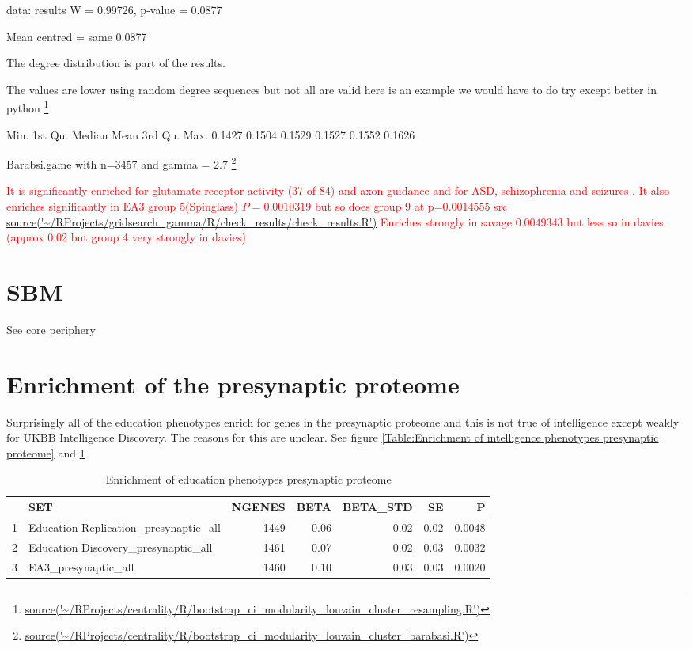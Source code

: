 data:  results
W = 0.99726, p-value = 0.0877

Mean centred = same 0.0877

The degree distribution is part of the results. 

The values are lower using random degree sequences but not all are valid here is an example we would have to do try except better in python \footnote{\url{source('~/RProjects/centrality/R/bootstrap_ci_modularity_louvain_cluster_resampling.R')}}

   Min. 1st Qu.  Median    Mean 3rd Qu.    Max. 
 0.1427  0.1504  0.1529  0.1527  0.1552  0.1626 
 
 Barabsi.game with n=3457 and gamma = 2.7
 \footnote{\url{source('~/RProjects/centrality/R/bootstrap_ci_modularity_louvain_cluster_barabasi.R')}}
 

\textcolor{red}{It is significantly enriched for glutamate receptor activity (37 of 84) and axon guidance and for ASD, schizophrenia and seizures . It also enriches significantly in EA3 group 5(Spinglass) $P=0.0010319$ but so does group 9 at p=$0.0014555$ src \url{source('~/RProjects/gridsearch_gamma/R/check_results/check_results.R')}
Enriches strongly in savage $0.0049343$ but less so in davies (approx 0.02 but group 4 very strongly in davies)}

\section{SBM}
See core periphery



 
 \section{Enrichment of the presynaptic proteome}
 
 Surprisingly all of the education phenotypes enrich for genes in the presynaptic proteome and this is not true of intelligence except weakly for UKBB Intelligence Discovery. The reasons for this are unclear. See figure \ref{Table:Enrichment of intelligence phenotypes presynaptic proteome} and \ref{Table:Enrichment of education phenotypes presynaptic proteome}
 


\begin{table}
\centering
\begin{tabular}{rlrrrrr}
  \hline
 & SET & NGENES & BETA & BETA\_STD & SE & P \\ 
  \hline
1 & Education Replication\_presynaptic\_all & 1449 & 0.06 & 0.02 & 0.02 & 0.0048 \\ 
  2 & Education Discovery\_presynaptic\_all & 1461 & 0.07 & 0.02 & 0.03 & 0.0032 \\ 
  3 & EA3\_presynaptic\_all & 1460 & 0.10 & 0.03 & 0.03 & 0.0020 \\ 
   \hline
\end{tabular}
\caption{Enrichment of education phenotypes presynaptic proteome} 
\label{Table:Enrichment of education phenotypes presynaptic proteome}
\end{table}




